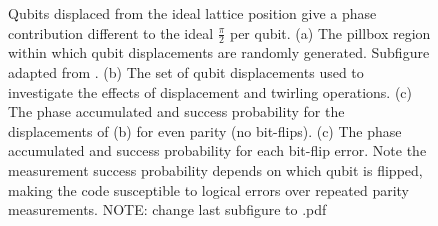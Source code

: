 \begin{figure}
	\caption{Qubits displaced from the ideal lattice position give a phase contribution different to the ideal $\tfrac{\pi}{2}$ per qubit. (a) The pillbox region within which qubit displacements are randomly generated. Subfigure adapted from \cite{OGorman2016}. (b) The set of qubit displacements used to investigate the effects of displacement and twirling operations. (c) The phase accumulated and success probability for the displacements of (b) for even parity (no bit-flips). (c) The phase accumulated and success probability for each bit-flip error. Note the measurement success probability depends on which qubit is flipped, making the code susceptible to logical errors over repeated parity measurements. NOTE: change last subfigure to .pdf}
\end{figure}

%	
%	





